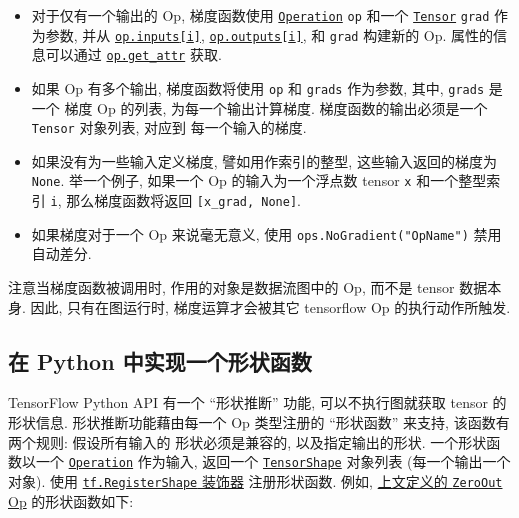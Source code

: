 \begin{itemize}
\item
  对于仅有一个输出的 Op, 梯度函数使用
  \href{tensorflow-zh/SOURCE/api_docs/python/framework.md\#Operation}{\texttt{Operation}}
  \texttt{op} 和一个
  \href{tensorflow-zh/SOURCE/api_docs/python/framework.md\#Tensor}{\texttt{Tensor}}
  \texttt{grad} 作为参数, 并从
  \href{tensorflow-zh/SOURCE/api_docs/python/framework.md\#Operation.inputs}{\texttt{op.inputs{[}i{]}}},
  \href{tensorflow-zh/SOURCE/api_docs/python/framework.md\#Operation.outputs}{\texttt{op.outputs{[}i{]}}},
  和 \texttt{grad} 构建新的 Op. 属性的信息可以通过
  \href{tensorflow-zh/SOURCE/api_docs/python/framework.md\#Operation.get_attr}{\texttt{op.get\_attr}}
  获取.
\item
  如果 Op 有多个输出, 梯度函数将使用 \texttt{op} 和 \texttt{grads}
  作为参数, 其中, \texttt{grads} 是一个 梯度 Op 的列表,
  为每一个输出计算梯度. 梯度函数的输出必须是一个 \texttt{Tensor}
  对象列表, 对应到 每一个输入的梯度.
\item
  如果没有为一些输入定义梯度, 譬如用作索引的整型, 这些输入返回的梯度为
  \texttt{None}. 举一个例子, 如果一个 Op 的输入为一个浮点数 tensor
  \texttt{x} 和一个整型索引 \texttt{i}, 那么梯度函数将返回
  \texttt{{[}x\_grad,\ None{]}}.
\item
  如果梯度对于一个 Op 来说毫无意义, 使用
  \texttt{ops.NoGradient("OpName")} 禁用自动差分.
\end{itemize}

注意当梯度函数被调用时, 作用的对象是数据流图中的 Op, 而不是 tensor
数据本身. 因此, 只有在图运行时, 梯度运算才会被其它 tensorflow Op
的执行动作所触发.

\subsection{在 Python 中实现一个形状函数
}\label{ux5728-python-ux4e2dux5b9eux73b0ux4e00ux4e2aux5f62ux72b6ux51fdux6570}

TensorFlow Python API 有一个 ``形状推断'' 功能, 可以不执行图就获取
tensor 的形状信息. 形状推断功能藉由每一个 Op 类型注册的 ``形状函数''
来支持, 该函数有两个规则: 假设所有输入的 形状必须是兼容的,
以及指定输出的形状. 一个形状函数以一个
\href{tensorflow-zh/SOURCE/api_docs/python/framework.md\#Operation}{\texttt{Operation}}
作为输入, 返回一个
\href{tensorflow-zh/SOURCE/api_docs/python/framework.md\#TensorShape}{\texttt{TensorShape}}
对象列表 (每一个输出一个对象). 使用
\href{tensorflow-zh/SOURCE/api_docs/python/framework.md\#RegisterShape}{\texttt{tf.RegisterShape}
装饰器} 注册形状函数. 例如,
\protect\hyperlink{defineux5finterface}{上文定义的 \texttt{ZeroOut} Op}
的形状函数如下:

